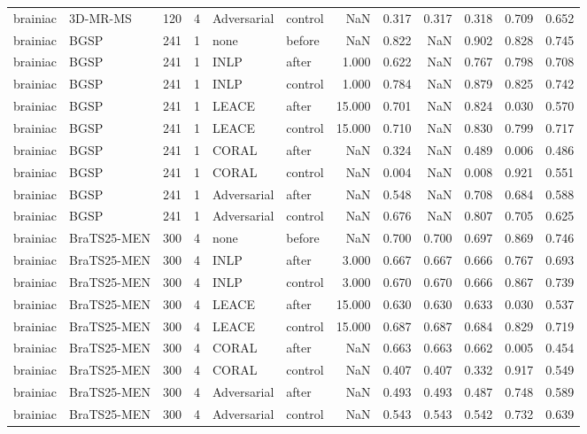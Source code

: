 \begin{tabular}{llrrllrrrrrr}
brainiac & 3D-MR-MS & 120 & 4 & Adversarial & control & NaN & 0.317 & 0.317 & 0.318 & 0.709 & 0.652 \\
brainiac & BGSP & 241 & 1 & none & before & NaN & 0.822 & NaN & 0.902 & 0.828 & 0.745 \\
brainiac & BGSP & 241 & 1 & INLP & after & 1.000 & 0.622 & NaN & 0.767 & 0.798 & 0.708 \\
brainiac & BGSP & 241 & 1 & INLP & control & 1.000 & 0.784 & NaN & 0.879 & 0.825 & 0.742 \\
brainiac & BGSP & 241 & 1 & LEACE & after & 15.000 & 0.701 & NaN & 0.824 & 0.030 & 0.570 \\
brainiac & BGSP & 241 & 1 & LEACE & control & 15.000 & 0.710 & NaN & 0.830 & 0.799 & 0.717 \\
brainiac & BGSP & 241 & 1 & CORAL & after & NaN & 0.324 & NaN & 0.489 & 0.006 & 0.486 \\
brainiac & BGSP & 241 & 1 & CORAL & control & NaN & 0.004 & NaN & 0.008 & 0.921 & 0.551 \\
brainiac & BGSP & 241 & 1 & Adversarial & after & NaN & 0.548 & NaN & 0.708 & 0.684 & 0.588 \\
brainiac & BGSP & 241 & 1 & Adversarial & control & NaN & 0.676 & NaN & 0.807 & 0.705 & 0.625 \\
brainiac & BraTS25-MEN & 300 & 4 & none & before & NaN & 0.700 & 0.700 & 0.697 & 0.869 & 0.746 \\
brainiac & BraTS25-MEN & 300 & 4 & INLP & after & 3.000 & 0.667 & 0.667 & 0.666 & 0.767 & 0.693 \\
brainiac & BraTS25-MEN & 300 & 4 & INLP & control & 3.000 & 0.670 & 0.670 & 0.666 & 0.867 & 0.739 \\
brainiac & BraTS25-MEN & 300 & 4 & LEACE & after & 15.000 & 0.630 & 0.630 & 0.633 & 0.030 & 0.537 \\
brainiac & BraTS25-MEN & 300 & 4 & LEACE & control & 15.000 & 0.687 & 0.687 & 0.684 & 0.829 & 0.719 \\
brainiac & BraTS25-MEN & 300 & 4 & CORAL & after & NaN & 0.663 & 0.663 & 0.662 & 0.005 & 0.454 \\
brainiac & BraTS25-MEN & 300 & 4 & CORAL & control & NaN & 0.407 & 0.407 & 0.332 & 0.917 & 0.549 \\
brainiac & BraTS25-MEN & 300 & 4 & Adversarial & after & NaN & 0.493 & 0.493 & 0.487 & 0.748 & 0.589 \\
brainiac & BraTS25-MEN & 300 & 4 & Adversarial & control & NaN & 0.543 & 0.543 & 0.542 & 0.732 & 0.639 \\

\end{tabular}
